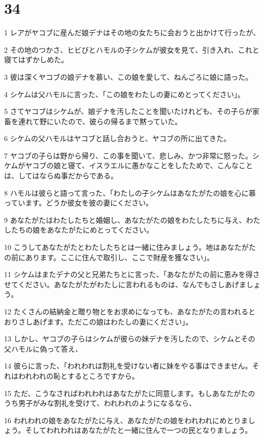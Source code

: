 \chapter{34}

\par 1 レアがヤコブに産んだ娘デナはその地の女たちに会おうと出かけて行ったが、
\par 2 その地のつかさ、ヒビびとハモルの子シケムが彼女を見て、引き入れ、これと寝てはずかしめた。
\par 3 彼は深くヤコブの娘デナを慕い、この娘を愛して、ねんごろに娘に語った。
\par 4 シケムは父ハモルに言った、「この娘をわたしの妻にめとってください」。
\par 5 さてヤコブはシケムが、娘デナを汚したことを聞いたけれども、その子らが家畜を連れて野にいたので、彼らの帰るまで黙っていた。
\par 6 シケムの父ハモルはヤコブと話し合おうと、ヤコブの所に出てきた。
\par 7 ヤコブの子らは野から帰り、この事を聞いて、悲しみ、かつ非常に怒った。シケムがヤコブの娘と寝て、イスラエルに愚かなことをしたためで、こんなことは、してはならぬ事だからである。
\par 8 ハモルは彼らと語って言った、「わたしの子シケムはあなたがたの娘を心に慕っています。どうか彼女を彼の妻にください。
\par 9 あなたがたはわたしたちと婚姻し、あなたがたの娘をわたしたちに与え、わたしたちの娘をあなたがたにめとってください。
\par 10 こうしてあなたがたとわたしたちとは一緒に住みましょう。地はあなたがたの前にあります。ここに住んで取引し、ここで財産を獲なさい」。
\par 11 シケムはまたデナの父と兄弟たちとに言った、「あなたがたの前に恵みを得させてください。あなたがたがわたしに言われるものは、なんでもさしあげましょう。
\par 12 たくさんの結納金と贈り物とをお求めになっても、あなたがたの言われるとおりさしあげます。ただこの娘はわたしの妻にください」。
\par 13 しかし、ヤコブの子らはシケムが彼らの妹デナを汚したので、シケムとその父ハモルに偽って答え、
\par 14 彼らに言った、「われわれは割礼を受けない者に妹をやる事はできません。それはわれわれの恥とするところですから。
\par 15 ただ、こうなさればわれわれはあなたがたに同意します。もしあなたがたのうち男子がみな割礼を受けて、われわれのようになるなら、
\par 16 われわれの娘をあなたがたに与え、あなたがたの娘をわれわれにめとりましょう。そしてわれわれはあなたがたと一緒に住んで一つの民となりましょう。
